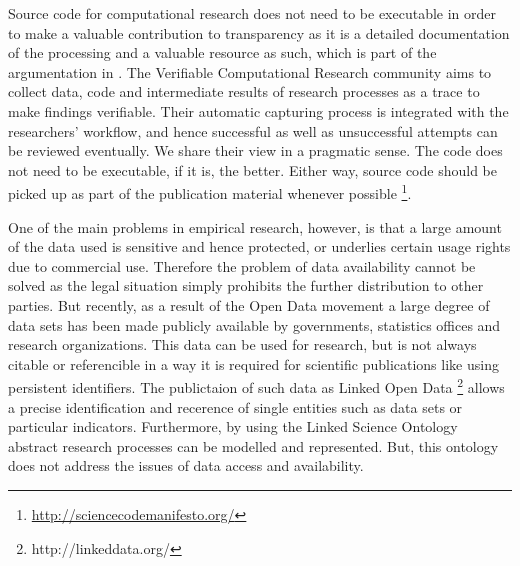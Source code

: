 \documentclass{acm_proc_article-sp}
\begin{document}
Source code for computational research does not need to be executable in order to make a valuable contribution to transparency
as it is a detailed documentation of the processing and a valuable resource as such, which is part of the argumentation in 
%
%
\cite{gavish2011universal}.
The Verifiable Computational Research community aims to collect data, code and intermediate results of research processes as a trace to make findings verifiable.
Their automatic capturing process is integrated with the researchers' workflow, and hence successful as well as unsuccessful attempts can be reviewed eventually. 
We share their view in a pragmatic sense. The code does not need to be executable, if it is, the better. %
Either way, source code should be picked up as part of the publication material whenever possible
%
%
%
\cite{barnes2012science}\footnote{\url{http://sciencecodemanifesto.org/}}.




One of the main problems in empirical research, however, is that a large amount of the data used is sensitive and hence protected, or underlies certain usage rights due to commercial use. %
Therefore the problem of data availability cannot be solved as the legal situation simply prohibits the further distribution to other parties.
But recently, as a result of the Open Data movement a large degree of data sets has been made publicly available by governments, statistics offices and research organizations. This data can be used for research, but is not always citable or referencible in a way it is required for scientific publications like using persistent identifiers. The publictaion of such data as Linked Open Data \footnote{http://linkeddata.org/} allows a precise identification and recerence of single entities such as data sets or particular indicators. Furthermore, by using the Linked Science Ontology \cite{kauppinen_et_al_linked_science_2011} abstract research processes can be modelled and represented. But, this ontology does not address the issues of data access and availability.
\end{document}
